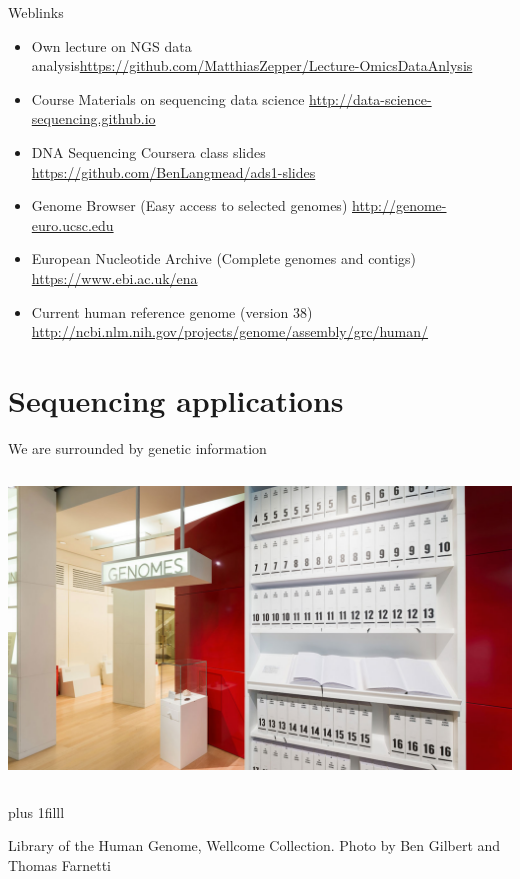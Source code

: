 \documentclass[10pt]{beamer}
\newcommand{\credit}[1]{{\vskip0pt plus 1filll \par \raggedleft \scriptsize \mdseries \color{mDarkBrown} #1 \par}}
\begin{document}
\begin{frame}{Weblinks}
	\begin{itemize}
		\item Own lecture on NGS data analysis\linebreak \url{https://github.com/MatthiasZepper/Lecture-OmicsDataAnlysis}
		\item Course Materials on sequencing data science \linebreak \url{http://data-science-sequencing.github.io}
		\item DNA Sequencing Coursera class slides \linebreak \url{https://github.com/BenLangmead/ads1-slides}
		\item Genome Browser (Easy access to selected genomes) \linebreak \url{http://genome-euro.ucsc.edu}
		\item European Nucleotide Archive (Complete genomes and contigs) \linebreak \url{https://www.ebi.ac.uk/ena}
		\item Current human reference genome (version 38) \linebreak \url{http://ncbi.nlm.nih.gov/projects/genome/assembly/grc/human/}
	\end{itemize}
\end{frame}





\section{Sequencing applications}


\begin{frame}{We are surrounded by genetic information}
	\begin{columns}[T]
		\column{\dimexpr\paperwidth-10pt}
		\includegraphics[width=\textwidth]{./figures/WellcomeCollectionGenome.jpg}
	\end{columns}
\credit{Library of the Human Genome, Wellcome Collection. Photo by Ben Gilbert and Thomas Farnetti}
\end{frame}
\end{document}
